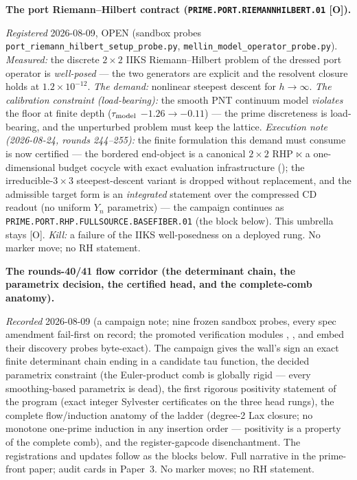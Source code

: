 \documentclass[11pt,a4paper]{article}
\begin{document}
\par\smallskip\noindent\textbf{The port Riemann--Hilbert contract
(\texttt{PRIME.PORT.\allowbreak RIEMANNHILBERT.01} [O]).}
{\sloppy
\emph{Registered} 2026-08-09, OPEN (sandbox probes
\texttt{port\_riemann\_hilbert\_setup\_probe.py},
\texttt{mellin\_model\_operator\_probe.py}).  \emph{Measured:}
the discrete $2\times2$ IIKS Riemann--Hilbert problem of the
dressed port operator is \emph{well-posed} --- the two generators
are explicit and the resolvent closure holds at
$1.2\times10^{-12}$.  \emph{The demand:} nonlinear steepest
descent for $h \to \infty$.  \emph{The calibration constraint
(load-bearing):} the smooth PNT continuum model \emph{violates}
the floor at finite depth ($\tau_{\rm model}$ $-1.26 \to -0.11$)
--- the prime discreteness is load-bearing, and the unperturbed
problem must keep the lattice.  \emph{Execution note (2026-08-24, rounds 244--255):} the
finite formulation this demand must consume is now certified
--- the bordered end-object is a canonical $2\times2$ RHP
$\ltimes$ a one-dimensional budget cocycle with exact
evaluation infrastructure
(); the
irreducible-$3\times3$ steepest-descent variant is dropped
without replacement, and the admissible target form is an
\emph{integrated} statement over the compressed CD readout
(no uniform $Y_n$ parametrix) --- the campaign continues as
\texttt{PRIME.PORT.RHP.FULLSOURCE.\allowbreak BASEFIBER.01}
(the block below).  This umbrella stays [O].  \emph{Kill:} a
failure of the
IIKS well-posedness on a deployed rung.  No marker move; no RH
statement.\par}

\par\smallskip\noindent\textbf{The rounds-40/41 flow corridor
(the determinant chain, the parametrix decision, the certified
head, and the complete-comb anatomy).}
{\sloppy
\emph{Recorded} 2026-08-09 (a campaign note; nine frozen sandbox
probes, every spec amendment fail-first on record; the promoted
verification modules
,
,
 and
 embed their discovery
probes byte-exact).  The campaign gives the wall's sign an exact
finite determinant chain ending in a candidate tau function, the
decided parametrix constraint (the Euler-product comb is
globally rigid --- every smoothing-based parametrix is dead),
the first rigorous positivity statement of the program (exact
integer Sylvester certificates on the three head rungs), the
complete flow/induction anatomy of the ladder (degree-2 Lax
closure; no monotone one-prime induction in any insertion order
--- positivity is a property of the complete comb), and the
register-gapcode disenchantment.  The registrations and updates
follow as the blocks below.  Full narrative in the prime-front
paper; audit cards in Paper~3.  No marker moves; no RH
statement.\par}
\end{document}
